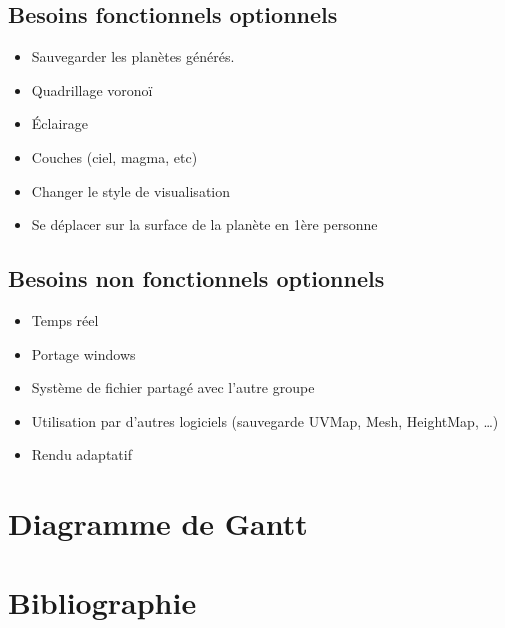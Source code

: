 \documentclass[a4paper]{article}
\begin{document}
\subsection{Besoins fonctionnels optionnels}
\begin{itemize}
\item Sauvegarder les planètes générés.
\item Quadrillage voronoï
\item Éclairage
\item Couches (ciel, magma, etc)
\item Changer le style de visualisation
\item Se déplacer sur la surface de la planète en 1ère personne
\end{itemize}
    
\subsection{Besoins non fonctionnels optionnels}
\begin{itemize}
\item Temps réel
\item Portage windows
\item Système de fichier partagé avec l’autre groupe
\item Utilisation par d’autres logiciels (sauvegarde UVMap, Mesh, HeightMap, …)
\item Rendu adaptatif
\end{itemize}

\section{Diagramme de Gantt}

\section{Bibliographie}

\begin{comment}
Icosahedron
\end{comment}
\end{document}
